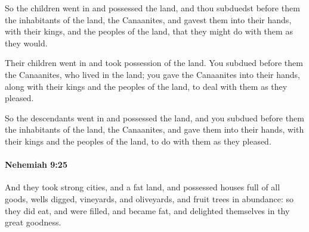 			\begin{versebox}
					\item[BHS] 
					\item[LXX] 
					\item[ASV] So the children went in and possessed the land, and thou subduedst before them the inhabitants of the land, the Canaanites, and gavest them into their hands, with their kings, and the peoples of the land, that they might do with them as they would.
					\item[NIV] Their children went in and took possession of the land. You subdued before them the Canaanites, who lived in the land; you gave the Canaanites into their hands, along with their kings and the peoples of the land, to deal with them as they pleased.
					\item[NRSV] So the descendants went in and possessed the land, and you subdued before them the inhabitants of the land, the Canaanites, and gave them into their hands, with their kings and the peoples of the land, to do with them as they pleased.
			\end{versebox}

		\paragraph{Nehemiah 9:25} %
			\label{NEHEMIAH-9-25}

			And they took strong cities, and a fat land, and possessed houses full of all goods, wells digged, vineyards, and oliveyards, and fruit trees in abundance: so they did eat, and were filled, and became fat, and delighted themselves in thy great goodness.

